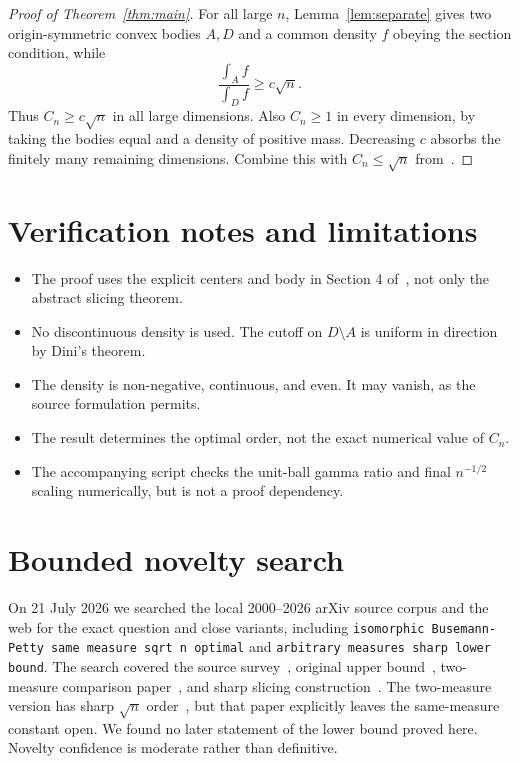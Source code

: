 \documentclass[11pt]{article}
\begin{document}
\begin{proof}[Proof of Theorem~\ref{thm:main}]
For all large $n$, Lemma~\ref{lem:separate} gives two origin-symmetric convex
bodies $A,D$ and a common density $f$ obeying the section condition, while
\[
 \frac{\int_Af}{\int_Df}\geq c\sqrt n.
\]
Thus $C_n\geq c\sqrt n$ in all large dimensions. Also $C_n\geq1$ in every
dimension, by taking the bodies equal and a density of positive mass.
Decreasing $c$ absorbs the finitely many remaining dimensions. Combine this
with $C_n\leq\sqrt n$ from~\cite{KZ}.
\end{proof}

\section{Verification notes and limitations}
\begin{itemize}
\item The proof uses the explicit centers and body in Section 4 of~\cite{KL},
not only the abstract slicing theorem.
\item No discontinuous density is used. The cutoff on $D\setminus A$ is
uniform in direction by Dini's theorem.
\item The density is non-negative, continuous, and even. It may vanish, as the
source formulation permits.
\item The result determines the optimal order, not the exact numerical value
of $C_n$.
\item The accompanying script checks the unit-ball gamma ratio and final
$n^{-1/2}$ scaling numerically, but is not a proof dependency.
\end{itemize}

\section{Bounded novelty search}
On 21 July 2026 we searched the local 2000--2026 arXiv source corpus and the
web for the exact question and close variants, including
\texttt{isomorphic Busemann-Petty same measure sqrt n optimal} and
\texttt{arbitrary measures sharp lower bound}. The search covered the source
survey~\cite{KRV}, original upper bound~\cite{KZ}, two-measure comparison
paper~\cite{KPZ}, and sharp slicing construction~\cite{KL}. The two-measure
version has sharp $\sqrt n$ order~\cite{KPZ}, but that paper explicitly leaves
the same-measure constant open. We found no later statement of the lower bound
proved here. Novelty confidence is moderate rather than definitive.
\end{document}
